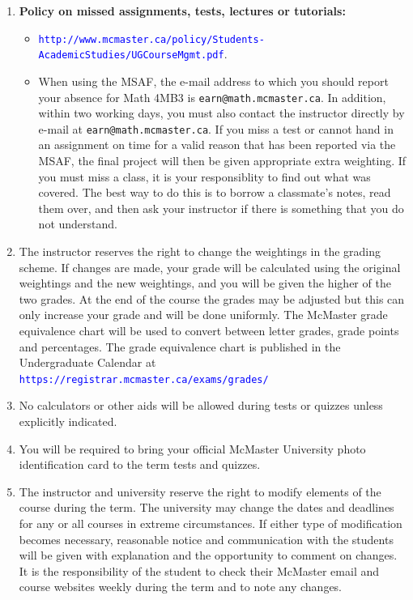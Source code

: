 \documentclass[12pt]{article}
\newcommand{\url}[1]{{\tt\textcolor{blue}{#1}}}
\begin{document}
\begin{enumerate}\addtolength{\itemsep}{-0.5\baselineskip}

\item {\bf Policy on missed assignments, tests, lectures or tutorials:} 
\begin{itemize}
\item \url{http://www.mcmaster.ca/policy/Students-AcademicStudies/UGCourseMgmt.pdf}.
\item When using the MSAF, the e-mail address to which you should report your absence for Math 4MB3 is {\tt earn@math.mcmaster.ca}.  In addition, within two working days, you must also contact the instructor directly by e-mail at {\tt earn@math.mcmaster.ca}.  If you miss a test or cannot hand in an assignment on time for a valid reason that has been reported via the MSAF, the final project will then be given appropriate extra weighting.  If you must miss a class, it is your responsiblity to find out what was covered.  The best way to do this is to borrow a classmate's notes, read them over, and then ask your instructor if there is something that you do not understand.
\end{itemize}

\item The instructor reserves the right to change the weightings in the grading scheme. If changes are made, your grade will be calculated using the original weightings and the new weightings, and you will be given the higher of the two grades.  At the end of the course the grades may be adjusted but this can only increase your grade and will be done uniformly.  The McMaster grade equivalence chart will be used to convert between letter grades, grade points and percentages.  The grade equivalence chart is published in the Undergraduate Calendar at \url{https://registrar.mcmaster.ca/exams/grades/}

\item No calculators or other aids will be allowed during tests or quizzes unless explicitly indicated.

\item You will be required to bring your official McMaster University photo identification card to the term tests and quizzes.

\item The instructor and university reserve the right to modify elements of the course during the term.  The university may change the dates and deadlines for any or all courses in extreme circumstances.  If either type of modification becomes necessary, reasonable notice and communication with the students will be given with explanation and the opportunity to comment on changes.  It is the responsibility of the student to check their McMaster email and course websites weekly during the term and to note any changes.

\end{enumerate}
\end{document}
